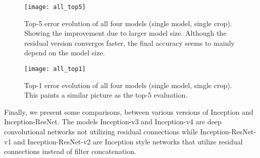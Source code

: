 \documentclass[10pt,twocolumn,letterpaper]{article}
\begin{document}
\begin{figure}
\centering
\texttt{[image: all\_top5]}
\caption{Top-5 error evolution of all four models (single model, single crop).
  Showing the improvement due to larger model size. Although the residual
  version converges faster, the final accuracy seems to mainly depend on the
  model size.
}
\label{fig:alltop5}
\end{figure}

\begin{figure}
\centering
\texttt{[image: all\_top1]}
\caption{Top-1 error evolution of all four models (single model, single crop).
  This paints a similar picture as the top-5 evaluation.
}
\label{fig:alltop1}
\end{figure}

Finally, we present some comparisons, between various versions of Inception
and Inception-ResNet. The models Inception-v3 and Inception-v4 are deep
convolutional networks not utilizing residual connections while
Inception-ResNet-v1 and Inception-ResNet-v2 are Inception style networks
that utilize residual connections instead of filter concatenation.
\end{document}
